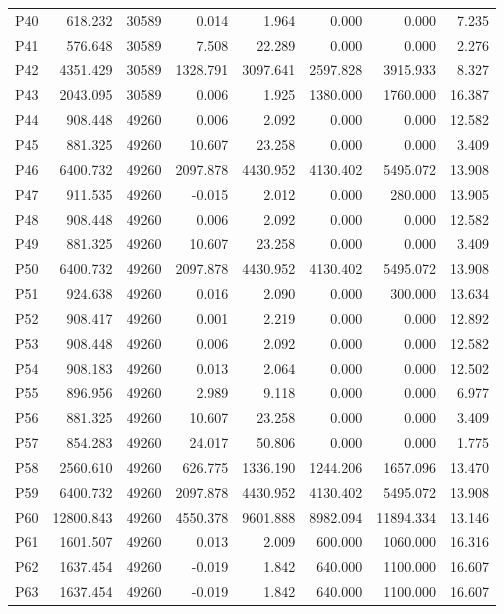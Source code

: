 \begin{longtable}{lrrrrrrr}
P40 & 618.232 & 30589 & 0.014 & 1.964 & 0.000 & 0.000 & 7.235\\
P41 & 576.648 & 30589 & 7.508 & 22.289 & 0.000 & 0.000 & 2.276\\
P42 & 4351.429 & 30589 & 1328.791 & 3097.641 & 2597.828 & 3915.933 & 8.327\\
P43 & 2043.095 & 30589 & 0.006 & 1.925 & 1380.000 & 1760.000 & 16.387\\
P44 & 908.448 & 49260 & 0.006 & 2.092 & 0.000 & 0.000 & 12.582\\
P45 & 881.325 & 49260 & 10.607 & 23.258 & 0.000 & 0.000 & 3.409\\
P46 & 6400.732 & 49260 & 2097.878 & 4430.952 & 4130.402 & 5495.072 & 13.908\\
P47 & 911.535 & 49260 & -0.015 & 2.012 & 0.000 & 280.000 & 13.905\\
P48 & 908.448 & 49260 & 0.006 & 2.092 & 0.000 & 0.000 & 12.582\\
P49 & 881.325 & 49260 & 10.607 & 23.258 & 0.000 & 0.000 & 3.409\\
P50 & 6400.732 & 49260 & 2097.878 & 4430.952 & 4130.402 & 5495.072 & 13.908\\
P51 & 924.638 & 49260 & 0.016 & 2.090 & 0.000 & 300.000 & 13.634\\
P52 & 908.417 & 49260 & 0.001 & 2.219 & 0.000 & 0.000 & 12.892\\
P53 & 908.448 & 49260 & 0.006 & 2.092 & 0.000 & 0.000 & 12.582\\
P54 & 908.183 & 49260 & 0.013 & 2.064 & 0.000 & 0.000 & 12.502\\
P55 & 896.956 & 49260 & 2.989 & 9.118 & 0.000 & 0.000 & 6.977\\
P56 & 881.325 & 49260 & 10.607 & 23.258 & 0.000 & 0.000 & 3.409\\
P57 & 854.283 & 49260 & 24.017 & 50.806 & 0.000 & 0.000 & 1.775\\
P58 & 2560.610 & 49260 & 626.775 & 1336.190 & 1244.206 & 1657.096 & 13.470\\
P59 & 6400.732 & 49260 & 2097.878 & 4430.952 & 4130.402 & 5495.072 & 13.908\\
P60 & 12800.843 & 49260 & 4550.378 & 9601.888 & 8982.094 & 11894.334 & 13.146\\
P61 & 1601.507 & 49260 & 0.013 & 2.009 & 600.000 & 1060.000 & 16.316\\
P62 & 1637.454 & 49260 & -0.019 & 1.842 & 640.000 & 1100.000 & 16.607\\
P63 & 1637.454 & 49260 & -0.019 & 1.842 & 640.000 & 1100.000 & 16.607\\

\end{longtable}
